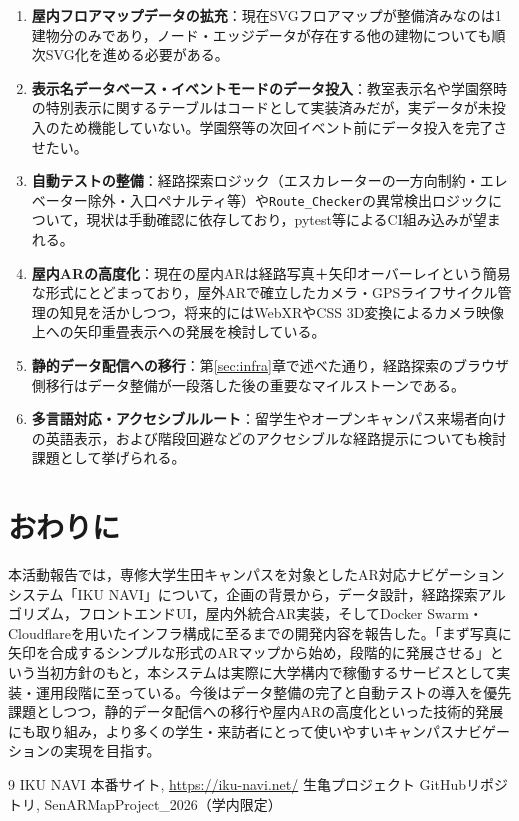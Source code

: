 \documentclass[a4paper,10.5pt]{ltjsarticle}
\begin{document}
\begin{enumerate}[itemsep=2pt]
  \item \textbf{屋内フロアマップデータの拡充}：現在SVGフロアマップが整備済みなのは1建物分のみであり，ノード・エッジデータが存在する他の建物についても順次SVG化を進める必要がある。
  \item \textbf{表示名データベース・イベントモードのデータ投入}：教室表示名や学園祭時の特別表示に関するテーブルはコードとして実装済みだが，実データが未投入のため機能していない。学園祭等の次回イベント前にデータ投入を完了させたい。
  \item \textbf{自動テストの整備}：経路探索ロジック（エスカレーターの一方向制約・エレベーター除外・入口ペナルティ等）や\texttt{Route\_Checker}の異常検出ロジックについて，現状は手動確認に依存しており，pytest等によるCI組み込みが望まれる。
  \item \textbf{屋内ARの高度化}：現在の屋内ARは経路写真＋矢印オーバーレイという簡易な形式にとどまっており，屋外ARで確立したカメラ・GPSライフサイクル管理の知見を活かしつつ，将来的にはWebXRやCSS 3D変換によるカメラ映像上への矢印重畳表示への発展を検討している。
  \item \textbf{静的データ配信への移行}：第\ref{sec:infra}章で述べた通り，経路探索のブラウザ側移行はデータ整備が一段落した後の重要なマイルストーンである。
  \item \textbf{多言語対応・アクセシブルルート}：留学生やオープンキャンパス来場者向けの英語表示，および階段回避などのアクセシブルな経路提示についても検討課題として挙げられる。
\end{enumerate}

\section{おわりに}

本活動報告では，専修大学生田キャンパスを対象としたAR対応ナビゲーションシステム「IKU NAVI」について，企画の背景から，データ設計，経路探索アルゴリズム，フロントエンドUI，屋内外統合AR実装，そしてDocker Swarm・Cloudflareを用いたインフラ構成に至るまでの開発内容を報告した。「まず写真に矢印を合成するシンプルな形式のARマップから始め，段階的に発展させる」という当初方針のもと，本システムは実際に大学構内で稼働するサービスとして実装・運用段階に至っている。今後はデータ整備の完了と自動テストの導入を優先課題としつつ，静的データ配信への移行や屋内ARの高度化といった技術的発展にも取り組み，より多くの学生・来訪者にとって使いやすいキャンパスナビゲーションの実現を目指す。

\begin{thebibliography}{9}
 IKU NAVI 本番サイト, \url{https://iku-navi.net/}
 生亀プロジェクト GitHubリポジトリ, SenARMapProject\_2026（学内限定）
\end{thebibliography}
\end{document}
